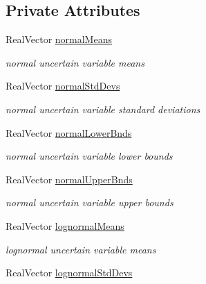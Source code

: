 \subsection*{Private Attributes}
\begin{DoxyCompactItemize}
\item 
Real\+Vector \hyperlink{classPecos_1_1AleatoryDistParamsRep_aedf879109473cf458aed37973acbb2df}{normal\+Means}\label{classPecos_1_1AleatoryDistParamsRep_aedf879109473cf458aed37973acbb2df}

\begin{DoxyCompactList}\small\item\em normal uncertain variable means \end{DoxyCompactList}\item 
Real\+Vector \hyperlink{classPecos_1_1AleatoryDistParamsRep_aa27cc2e1c59903f5b11fecd805053560}{normal\+Std\+Devs}\label{classPecos_1_1AleatoryDistParamsRep_aa27cc2e1c59903f5b11fecd805053560}

\begin{DoxyCompactList}\small\item\em normal uncertain variable standard deviations \end{DoxyCompactList}\item 
Real\+Vector \hyperlink{classPecos_1_1AleatoryDistParamsRep_a3c031d8aa233861241e36a2ef2ac7cc7}{normal\+Lower\+Bnds}\label{classPecos_1_1AleatoryDistParamsRep_a3c031d8aa233861241e36a2ef2ac7cc7}

\begin{DoxyCompactList}\small\item\em normal uncertain variable lower bounds \end{DoxyCompactList}\item 
Real\+Vector \hyperlink{classPecos_1_1AleatoryDistParamsRep_a14443cca188abec86df4c580e759f793}{normal\+Upper\+Bnds}\label{classPecos_1_1AleatoryDistParamsRep_a14443cca188abec86df4c580e759f793}

\begin{DoxyCompactList}\small\item\em normal uncertain variable upper bounds \end{DoxyCompactList}\item 
Real\+Vector \hyperlink{classPecos_1_1AleatoryDistParamsRep_a4ff7049a6193698ffd1377664a5a1639}{lognormal\+Means}\label{classPecos_1_1AleatoryDistParamsRep_a4ff7049a6193698ffd1377664a5a1639}

\begin{DoxyCompactList}\small\item\em lognormal uncertain variable means \end{DoxyCompactList}\item 
Real\+Vector \hyperlink{classPecos_1_1AleatoryDistParamsRep_a2fed80a280cdb5abe51aa02c46d94e11}{lognormal\+Std\+Devs}\label{classPecos_1_1AleatoryDistParamsRep_a2fed80a280cdb5abe51aa02c46d94e11}


\end{DoxyCompactItemize}
